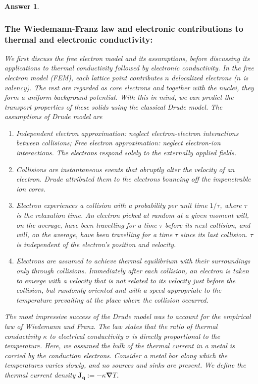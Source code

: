 \documentclass[a4paper]{article}
\newtheorem{ans}{Answer}[subsection]
\theoremstyle{new}
\begin{document}
\begin{ans}
\subsubsection*{The Wiedemann-Franz law and electronic contributions to thermal and electronic conductivity:}
We first discuss the free electron model and its assumptions, before discussing its applications to thermal conductivity followed by electronic conductivity. In the free electron model (FEM), each lattice point contributes $n$ delocalized electrons ($n$ is valency). The rest are regarded as core electrons and together with the nuclei, they form a uniform background potential. With this in mind, we can predict the transport properties of these solids using the classical Drude model. The assumptions of Drude model are
\begin{enumerate}
    \item Independent electron approximation: neglect electron-electron interactions between collisions; Free electron approximation: neglect electron-ion interactions. The electrons respond solely to the externally applied fields.
    \item Collisions are instantaneous events that abruptly alter the velocity of an electron. Drude attributed them to the electrons bouncing off the impenetrable ion cores.
    \item Electron experiences a collision with a probability per unit time $1/\tau$, where $\tau$ is the relaxation time. An electron picked at random at a given moment will, on the average, have been travelling for a time $\tau$ before its next collision, and will, on the average, have been travelling for a time $\tau$ since its last collision. $\tau$ is independent of the electron's position and velocity.
    \item Electrons are assumed to achieve thermal equilibrium with their surroundings only through collisions. Immediately after each collision, an electron is taken to emerge with a velocity that is not related to its velocity just before the collision, but randomly oriented and with a speed appropriate to the temperature prevailing at the place where the collision occurred.
\end{enumerate}
The most impressive success of the Drude model was to account for the empirical law of Wiedemann and Franz. The law states that the ratio of thermal conductivity $\kappa$ to electrical conductivity $\sigma$ is directly proportional to the temperature. Here, we assumed the bulk of the thermal current in a metal is carried by the conduction electrons. Consider a metal bar along which the temperatures varies slowly, and no sources and sinks are present. We define the thermal current density $\mathbf{J_q}:=-\kappa\boldsymbol{\nabla}T$.\\[5pt]

\end{ans}
\end{document}

